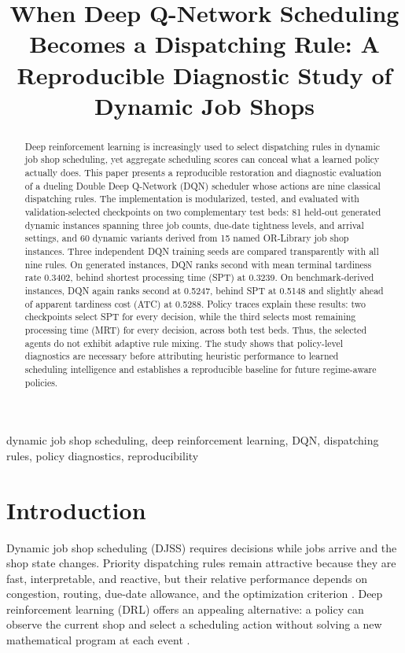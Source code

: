 \documentclass[conference]{IEEEtran}
\title{When Deep Q-Network Scheduling Becomes a Dispatching Rule: A Reproducible Diagnostic Study of Dynamic Job Shops}
\author{
\IEEEauthorblockN{Author Name}
\IEEEauthorblockA{
Department or School\\
Institution Name\\
City, Country\\
author.email@example.com}
}
\newcommand{\method}[1]{\textsc{#1}}
\newcommand{\dqn}{\method{DQN}}
\newcommand{\spt}{\method{SPT}}
\newcommand{\atc}{\method{ATC}}
\newcommand{\mrt}{\method{MRT}}
\begin{document}
\maketitle

\begin{abstract}
Deep reinforcement learning is increasingly used to select dispatching rules in dynamic job shop scheduling, yet aggregate scheduling scores can conceal what a learned policy actually does. This paper presents a reproducible restoration and diagnostic evaluation of a dueling Double Deep Q-Network (\dqn) scheduler whose actions are nine classical dispatching rules. The implementation is modularized, tested, and evaluated with validation-selected checkpoints on two complementary test beds: 81 held-out generated dynamic instances spanning three job counts, due-date tightness levels, and arrival settings, and 60 dynamic variants derived from 15 named OR-Library job shop instances. Three independent \dqn{} training seeds are compared transparently with all nine rules. On generated instances, \dqn{} ranks second with mean terminal tardiness rate 0.3402, behind shortest processing time (\spt) at 0.3239. On benchmark-derived instances, \dqn{} again ranks second at 0.5247, behind \spt{} at 0.5148 and slightly ahead of apparent tardiness cost (\atc) at 0.5288. Policy traces explain these results: two checkpoints select \spt{} for every decision, while the third selects most remaining processing time (\mrt) for every decision, across both test beds. Thus, the selected agents do not exhibit adaptive rule mixing. The study shows that policy-level diagnostics are necessary before attributing heuristic performance to learned scheduling intelligence and establishes a reproducible baseline for future regime-aware policies.
\end{abstract}

\begin{IEEEkeywords}
dynamic job shop scheduling, deep reinforcement learning, DQN, dispatching rules, policy diagnostics, reproducibility
\end{IEEEkeywords}

\section{Introduction}

Dynamic job shop scheduling (DJSS) requires decisions while jobs arrive and the shop state changes. Priority dispatching rules remain attractive because they are fast, interpretable, and reactive, but their relative performance depends on congestion, routing, due-date allowance, and the optimization criterion \cite{rajendran1999dispatching,vepsalainen1987atc}. Deep reinforcement learning (DRL) offers an appealing alternative: a policy can observe the current shop and select a scheduling action without solving a new mathematical program at each event \cite{luo2020dynamic,zhang2020l2d}.
\end{document}

